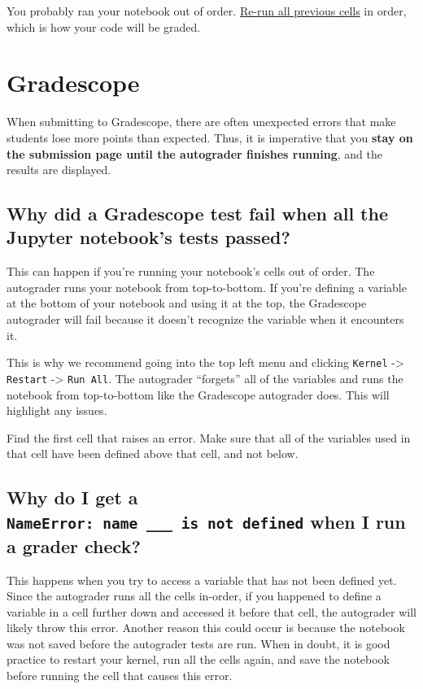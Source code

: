 \documentclass[
  letterpaper,
  DIV=11,
  numbers=noendperiod]{scrreprt}
\begin{document}
You probably ran your notebook out of order.
\href{https://ds100.org/debugging-guide/jupyter101/jupyter101.html\#running-cells}{Re-run
all previous cells} in order, which is how your code will be graded.

\section{Gradescope}\label{gradescope}

When submitting to Gradescope, there are often unexpected errors that
make students lose more points than expected. Thus, it is imperative
that you \textbf{stay on the submission page until the autograder
finishes running}, and the results are displayed.

\subsection{Why did a Gradescope test fail when all the Jupyter
notebook's tests
passed?}\label{why-did-a-gradescope-test-fail-when-all-the-jupyter-notebooks-tests-passed}

This can happen if you're running your notebook's cells out of order.
The autograder runs your notebook from top-to-bottom. If you're defining
a variable at the bottom of your notebook and using it at the top, the
Gradescope autograder will fail because it doesn't recognize the
variable when it encounters it.

This is why we recommend going into the top left menu and clicking
\texttt{Kernel} -\textgreater{} \texttt{Restart} -\textgreater{}
\texttt{Run\ All}. The autograder ``forgets'' all of the variables and
runs the notebook from top-to-bottom like the Gradescope autograder
does. This will highlight any issues.

Find the first cell that raises an error. Make sure that all of the
variables used in that cell have been defined above that cell, and not
below.

\subsection{\texorpdfstring{Why do I get a
\texttt{NameError:\ name\ \_\_\_\ is\ not\ defined} when I run a grader
check?}{Why do I get a NameError: name \_\_\_ is not defined when I run a grader check?}}\label{why-do-i-get-a-nameerror-name-___-is-not-defined-when-i-run-a-grader-check}

This happens when you try to access a variable that has not been defined
yet. Since the autograder runs all the cells in-order, if you happened
to define a variable in a cell further down and accessed it before that
cell, the autograder will likely throw this error. Another reason this
could occur is because the notebook was not saved before the autograder
tests are run. When in doubt, it is good practice to restart your
kernel, run all the cells again, and save the notebook before running
the cell that causes this error.
\end{document}
